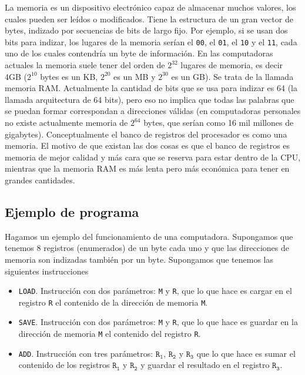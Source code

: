 \documentclass[a4paper, 12pt]{report}
\begin{document}
La memoria es un dispositivo electrónico capaz de almacenar muchos valores, los cuales pueden ser leídos o modificados. Tiene la estructura de un gran vector de bytes, indizado por secuencias de bits de largo fijo. Por ejemplo, si se usan dos bits para indizar, los lugares de la memoria serían el {\tt 00}, el {\tt 01}, el {\tt 10} y el {\tt 11}, cada uno de los cuales contendría un byte de información. En las computadoras actuales la memoria suele tener del orden de $2^{32}$ lugares de memoria, es decir 4GB ($2^{10}$ bytes es un KB, $2^{20}$ es un MB y $2^{30}$ es un GB). Se trata de la llamada memoria RAM. Actualmente la cantidad de bits que se usa para indizar es 64 (la llamada arquitectura de 64 bits), pero eso no implica que todas las palabras que se puedan formar correspondan a direcciones válidas (en computadoras personales no existe actualmente memoria de $2^{64}$ bytes, que serían como 16 mil millones de gigabytes). Conceptualmente el banco de registros del procesador es como una memoria. El motivo de que existan las dos cosas es que el banco de registros es memoria de mejor calidad y más cara que se reserva para estar dentro de la CPU, mientras que la memoria RAM es más lenta pero más económica para tener en grandes cantidades.

\subsection{Ejemplo de programa}

Hagamos un ejemplo del funcionamiento de una computadora. Supongamos que tenemos 8 registros (enumerados) de un byte cada uno y que las direcciones de memoria son indizadas también por un byte. Supongamos que tenemos las siguientes instrucciones
\begin{itemize}
	\item {\tt LOAD}. Instrucción con dos parámetros: {\tt M} y {\tt R}, que lo que hace es cargar en el registro {\tt R} el contenido de la dirección de memoria {\tt M}.
	\item {\tt SAVE}. Instrucción con dos parámetros: {\tt M} y {\tt R}, que lo que hace es guardar en la dirección de memoria {\tt M} el contenido del registro {\tt R}.
	\item {\tt ADD}. Instrucción con tres parámetros: $\mathtt{R_1}$, $\mathtt{R_2}$ y $\mathtt{R_3}$ que lo que hace es sumar el contenido de los registros $\mathtt{R_1}$ y $\mathtt{R_2}$ y guardar el resultado en el registro $\mathtt{R_3}$.
\end{itemize}
\end{document}
